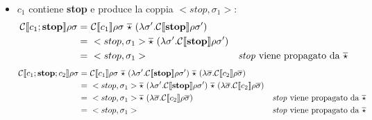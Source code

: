 \begin{itemize}
        \item $c_1$ contiene \textbf{stop} e produce la coppia $<stop, \sigma_1>$:
            \begin{align*}
                \mathcal{C}\doublebracket{c_1;\mbox{\textbf{stop}}}\rho\sigma =\ & \mathcal{C}\doublebracket{c_1}\rho\sigma\ \overline{\star}\ (\lambda\sigma'.\mathcal{C}\doublebracket{\mbox{\textbf{stop}}}\rho\sigma')\\
                =\ & <stop, \sigma_1> \overline{\star}\ (\lambda\sigma'.\mathcal{C}\doublebracket{\mbox{\textbf{stop}}}\rho\sigma')\\
                =\ & <stop,\sigma_1> &\mbox{\textit{stop} viene propagato da $\overline{\star}$}
            \end{align*}
            \begin{align*}
                \mathcal{C}\doublebracket{c_1;\mbox{\textbf{stop}};c_2}\rho\sigma =\ & \mathcal{C}\doublebracket{c_1}\rho\sigma\ \overline{\star}\ (\lambda\sigma'.\mathcal{C}\doublebracket{\mbox{\textbf{stop}}}\rho\sigma')\ \overline{\star}\ (\lambda\overline{\sigma}.\mathcal{C}\doublebracket{c_2}\rho\overline{\sigma})\\
                =\ & <stop,\sigma_1> \overline{\star}\ (\lambda\sigma'.\mathcal{C}\doublebracket{\mbox{\textbf{stop}}}\rho\sigma')\ \overline{\star}\ (\lambda\overline{\sigma}.\mathcal{C}\doublebracket{c_2}\rho\overline{\sigma})\\
                =\ & <stop,\sigma_1> \overline{\star}\ (\lambda\overline{\sigma}.\mathcal{C}\doublebracket{c_2}\rho\overline{\sigma}) &\mbox{\textit{stop} viene propagato da $\overline{\star}$}\\
                =\ & <stop,\sigma_1> &\mbox{\textit{stop} viene propagato da $\overline{\star}$}
            \end{align*}
            

\end{itemize}
